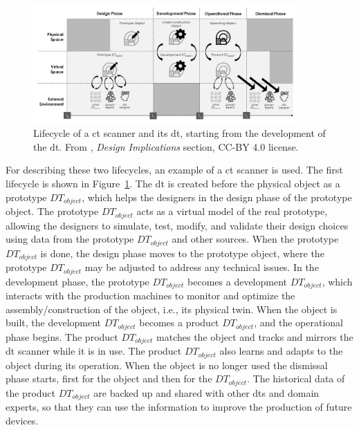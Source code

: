 \begin{figure}
    \centering
    \includegraphics[width=0.9\textwidth]{images/dt_lifecycle_1.png}
    \caption[Lifecycle of a \acrshort{ct} scanner and its \acrshort{dt}, starting from the development of the \acrshort{dt}]{Lifecycle of a \acrshort{ct} scanner and its \acrshort{dt}, starting from the development of the \acrshort{dt}. From \cite{barricelliSurveyDigitalTwin2019}, \textit{Design Implications} section, CC-BY 4.0 license.}
    \label{fig:dt_lifecycle_1}
\end{figure}

For describing these two lifecycles, an example of a \acrfull{ct} scanner is used. The first lifecycle is shown in Figure~\ref{fig:dt_lifecycle_1}. The \acrshort{dt} is created before the physical object as a prototype $DT_{object}$, which helps the designers in the design phase of the prototype object. The prototype $DT_{object}$ acts as a virtual model of the real prototype, allowing the designers to simulate, test, modify, and validate their design choices using data from the prototype $DT_{object}$ and other sources. When the prototype $DT_{object}$ is done, the design phase moves to the prototype object, where the prototype $DT_{object}$ may be adjusted to address any technical issues. In the development phase, the prototype $DT_{object}$ becomes a development $DT_{object}$, which interacts with the production machines to monitor and optimize the assembly/construction of the object, i.e., its physical twin. When the object is built, the development $DT_{object}$ becomes a product $DT_{object}$, and the operational phase begins. The product $DT_{object}$ matches the object and tracks and mirrors the \acrshort{dt} scanner while it is in use. The product $DT_{object}$ also learns and adapts to the object during its operation. When the object is no longer used the dismissal phase starts, first for the object and then for the $DT_{object}$. The historical data of the product $DT_{object}$ are backed up and shared with other \acrshort{dt}s and domain experts, so that they can use the information to improve the production of future devices.

